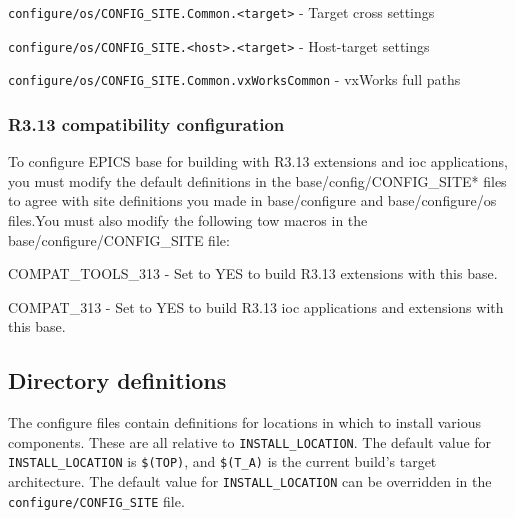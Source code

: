 \begin{description}
\item {} \verb|configure/os/CONFIG_SITE.Common.<target>| - Target cross settings

\item {} \verb|configure/os/CONFIG_SITE.<host>.<target>| - Host-target settings

\item {} \verb|configure/os/CONFIG_SITE.Common.vxWorksCommon| - vxWorks full paths

\end{description}

\subsubsection{R3.13 compatibility configuration}

To configure EPICS base for building with R3.13 extensions and ioc applications, you must modify the default definitions 
in the base/config/CONFIG\_SITE* files to agree with site definitions you made in base/configure and base/configure/os 
files.You must also modify the following tow macros in the base/configure/CONFIG\_SITE file:

\begin{description}
\item {}COMPAT\_TOOLS\_313 - Set to YES to build R3.13 extensions with this base.

\item {}COMPAT\_313 - Set to YES to build R3.13 ioc applications and extensions with this base.

\end{description}

\subsection{Directory definitions}

The configure files contain definitions for locations in which to install various components. These are all relative to 
\verb|INSTALL_LOCATION|. The default value for \verb|INSTALL_LOCATION| is \verb|$(TOP)|, and \verb|$(T_A)| is the current build's target 
architecture. The default value for \verb|INSTALL_LOCATION| can be overridden in the \verb|configure/CONFIG_SITE| file.

